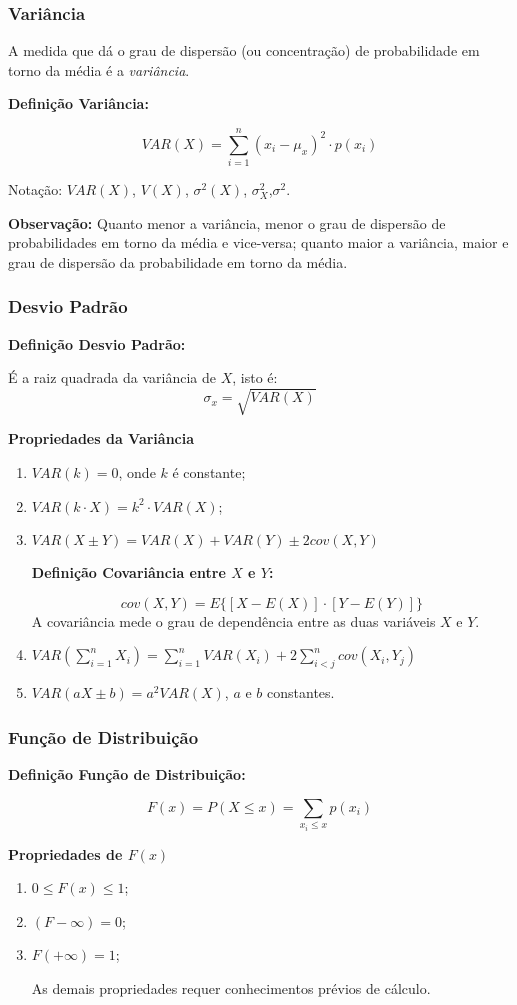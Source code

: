 \documentclass[hyperref={pdfpagelabels=false}]{beamer}
\begin{document}
\begin{frame}
\frametitle{Variância}

A medida que dá o grau de dispersão (ou concentração) de probabilidade em torno da média é a \emph{variância}.

\pause
{\bf Definição Variância:}

	$$VAR(X) = \sum_{i = 1}^{n}(x_i - \mu_x)^2 \cdot p(x_i)$$
	
	Notação: $VAR(X)$, $V(X)$, $\sigma^2(X)$, $\sigma_X^2$,$\sigma^2$.

\pause

{\bf Observação:} Quanto menor a variância, menor o grau de dispersão de probabilidades em torno da média e vice-versa; quanto maior a variância, maior e grau de dispersão da probabilidade em torno da média.

\end{frame}

\begin{frame}
\frametitle{Desvio Padrão}

{\bf Definição Desvio Padrão:}

É a raiz quadrada da variância de $X$, isto é:
$$\sigma_x = \sqrt{VAR(X)}$$

\pause
{\bf Propriedades da Variância}

\begin{enumerate}
	\item $VAR(k) = 0$, onde $k$ é constante; \pause
	\item $VAR(k\cdot X) = k^2 \cdot VAR(X)$; \pause
	\item $VAR(X \pm Y) = VAR(X) + VAR(Y) \pm 2cov(X,Y)$ \pause
	
	\footnotesize{
	{\bf Definição Covariância entre $X$ e $Y$:}
	
		$$cov(X,Y) =  E\{[X - E(X)]\cdot[Y - E(Y)]\}$$
		A covariância mede o grau de dependência entre as duas variáveis $X$ e $Y$.
	}
	
	\item $VAR\left(\displaystyle \sum_{i=1}^{n}X_i\right) = \displaystyle \sum_{i=1}^{n}VAR(X_i) + 2\displaystyle \sum_{i<j}^{n}cov(X_i , Y_j)$ \pause
	\item $VAR(aX \pm b) = a^2VAR(X)$, $a$ e $b$ constantes.
\end{enumerate}


\end{frame}

\begin{frame}
\frametitle{Função de Distribuição}
{\bf Definição Função de Distribuição:}

$$F(x) = P(X \leq x) = \sum_{x_i \leq x}p(x_i)$$

\pause
{\bf Propriedades de $F(x)$}
\pause
\begin{enumerate}
	\item $0 \leq F(x) \leq 1$; \pause
	\item $(F - \infty) = 0$; \pause
	\item $F(+\infty) = 1$; \pause
	
	As demais propriedades requer conhecimentos prévios de cálculo.
\end{enumerate}

\end{frame}
\end{document}
